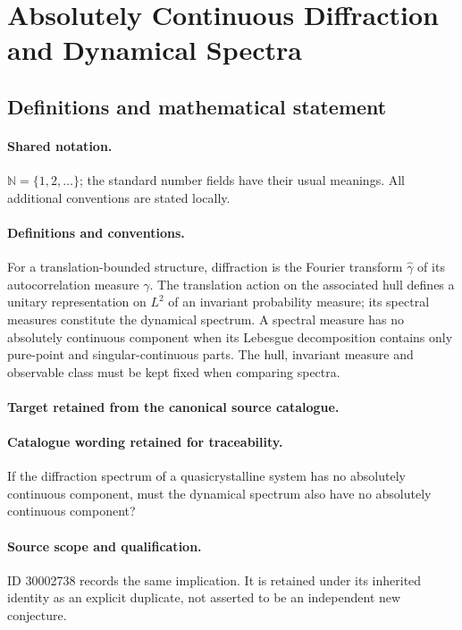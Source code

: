 \documentclass[11pt]{article}
\begin{document}
\section{Absolutely Continuous Diffraction and Dynamical Spectra}\label{statement}

\subsection{Definitions and mathematical statement}

\paragraph{Shared notation.}$\mathbb N=\{1,2,\ldots\}$; the standard number fields have their usual meanings. All additional conventions are stated locally.


\paragraph{Definitions and conventions.}
For a translation-bounded structure, diffraction is the Fourier transform $\widehat\gamma$ of its autocorrelation measure $\gamma$. The translation action on the associated hull defines a unitary representation on $L^2$ of an invariant probability measure; its spectral measures constitute the dynamical spectrum. A spectral measure has no absolutely continuous component when its Lebesgue decomposition contains only pure-point and singular-continuous parts. The hull, invariant measure and observable class must be kept fixed when comparing spectra.

\paragraph{Target retained from the canonical source catalogue.}
\paragraph{Catalogue wording retained for traceability.}
If the diffraction spectrum of a quasicrystalline system has no absolutely continuous component, must the dynamical spectrum also have no absolutely continuous component?

\paragraph{Source scope and qualification.}
ID 30002738 records the same implication. It is retained under its inherited identity as an explicit duplicate, not asserted to be an independent new conjecture.
\end{document}
